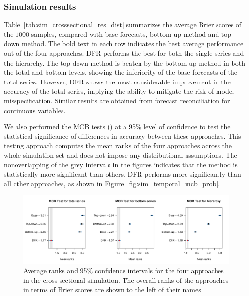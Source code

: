 \documentclass[a4paper,review,12pt,authoryear]{elsarticle}
\begin{document}
     \subsubsection{Simulation results}
     Table~\ref{tab:sim_crosssectional_res_dist} summarizes the average Brier scores of the $1000$ samples, compared with base forecasts, bottom-up method and top-down method.
     The bold text in each row indicates the best average performance out of the four approaches.
     DFR performs the best for both the single series and the hierarchy. 
     The top-down method is beaten by the bottom-up method in both the total and bottom levels, showing the inferiority of the base forecasts of the total series.
     However, DFR shows the most considerable improvement in the accuracy of the total series, implying the ability to mitigate the risk of model misspecification.
     Similar results are obtained from forecast reconciliation for continuous variables.
     
     We also performed the MCB tests (\citealp{koningM3CompetitionStatistical2005}) at a 95\% level of confidence to test the statistical significance of differences in accuracy between these approaches. 
     This testing approach computes the mean ranks of the four approaches across the whole simulation set and does not impose any distributional assumptions.
     The nonoverlapping of the grey intervals in the figures indicates that the method is statistically more significant than others.
     DFR performs more significantly than all other approaches, as shown in Figure~\ref{fig:sim_temporal_mcb_prob}.
     
     
     
     \begin{figure}
       \centering
       \label{fig:mcb_crosssectional}
       \caption{Average ranks and 95\% confidence intervals for the four approaches in the cross-sectional simulation. The overall ranks of the approaches in terms of Brier scores are shown to the left of their names.}
       \includegraphics[width=\textwidth]{figures/cross_sectional_mcb.pdf}
     \end{figure}
     
\end{document}
